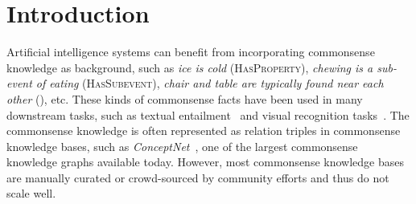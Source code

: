\section{Introduction}
Artificial intelligence systems can benefit from incorporating commonsense knowledge as background, 
such as \textit{ice is cold} (\textsc{HasProperty}), 
\textit{chewing is a sub-event of eating} (\textsc{HasSubevent}), 
\textit{chair and table are typically found near each other} (\lnear), etc. 
These kinds of commonsense facts have been used in many downstream tasks, such as textual entailment~\cite{dagan2009recognizing,bowman2015large} and visual recognition tasks~\cite{zhu2014reasoning}.
The commonsense knowledge is often represented as relation triples in commonsense knowledge bases, 
such as \textit{ConceptNet}~\cite{speer2012representing}, one of the largest commonsense knowledge graphs available today.
However, most commonsense knowledge bases are manually curated or crowd-sourced by community efforts and thus do not scale well.

